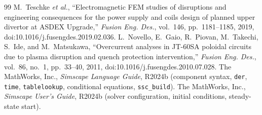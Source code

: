\documentclass[11pt,a4paper]{article}
\newcommand{\code}[1]{\texttt{#1}}
\begin{document}
\begin{thebibliography}{99}
 M.~Teschke \emph{et al.}, ``Electromagnetic FEM studies of disruptions and engineering consequences for the power supply and coils design of planned upper divertor at ASDEX Upgrade,'' \emph{Fusion Eng. Des.}, vol.~146, pp.~1181--1185, 2019, doi:10.1016/j.fusengdes.2019.02.036.
 L.~Novello, E.~Gaio, R.~Piovan, M.~Takechi, S.~Ide, and M.~Matsukawa, ``Overcurrent analyses in JT-60SA poloidal circuits due to plasma disruption and quench protection intervention,'' \emph{Fusion Eng. Des.}, vol.~86, no.~1, pp.~33--40, 2011, doi:10.1016/j.fusengdes.2010.07.028.
 The MathWorks, Inc., \emph{Simscape Language Guide}, R2024b (component syntax, \code{der}, \code{time}, \code{tablelookup}, conditional equations, \code{ssc\_build}).
 The MathWorks, Inc., \emph{Simscape User's Guide}, R2024b (solver configuration, initial conditions, steady-state start).
\end{thebibliography}
\end{document}
